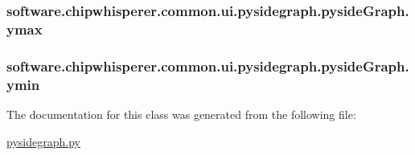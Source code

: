 \subsubsection[{ymax}]{\setlength{\rightskip}{0pt plus 5cm}software.\+chipwhisperer.\+common.\+ui.\+pysidegraph.\+pyside\+Graph.\+ymax}\label{classsoftware_1_1chipwhisperer_1_1common_1_1ui_1_1pysidegraph_1_1pysideGraph_a00fdd1c1b1bc39b2aa614a75d0179f13}
\hypertarget{classsoftware_1_1chipwhisperer_1_1common_1_1ui_1_1pysidegraph_1_1pysideGraph_aa375bd6e4a50393a64c9f1a6e9938cbb}{}
\subsubsection[{ymin}]{\setlength{\rightskip}{0pt plus 5cm}software.\+chipwhisperer.\+common.\+ui.\+pysidegraph.\+pyside\+Graph.\+ymin}\label{classsoftware_1_1chipwhisperer_1_1common_1_1ui_1_1pysidegraph_1_1pysideGraph_aa375bd6e4a50393a64c9f1a6e9938cbb}


The documentation for this class was generated from the following file\+:\begin{DoxyCompactItemize}
\item 
\hyperlink{pysidegraph_8py}{pysidegraph.\+py}\end{DoxyCompactItemize}
